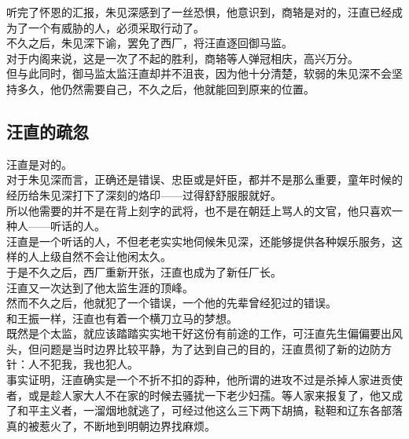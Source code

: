 \begin{multicols}{\theparacolNo}
听完了怀恩的汇报，朱见深感到了一丝恐惧，他意识到，商辂是对的，汪直已经成为了一个有威胁的人，必须采取行动了。\\

不久之后，朱见深下谕，罢免了西厂，将汪直逐回御马监。\\

对于内阁来说，这是一次了不起的胜利，商辂等人弹冠相庆，高兴万分。\\

但与此同时，御马监太监汪直却并不沮丧，因为他十分清楚，软弱的朱见深不会坚持多久，他仍然需要自己，不久之后，他就能回到原来的位置。\\

\subsection{汪直的疏忽}
汪直是对的。\\

对于朱见深而言，正确还是错误、忠臣或是奸臣，都并不是那么重要，童年时候的经历给朱见深打下了深刻的烙印——过得舒舒服服就好。\\

所以他需要的并不是在背上刻字的武将，也不是在朝廷上骂人的文官，他只喜欢一种人——听话的人。\\

汪直是一个听话的人，不但老老实实地伺候朱见深，还能够提供各种娱乐服务，这样的人上级自然不会让他闲太久。\\

于是不久之后，西厂重新开张，汪直也成为了新任厂长。\\

汪直又一次达到了他太监生涯的顶峰。\\

然而不久之后，他就犯了一个错误，一个他的先辈曾经犯过的错误。\\

和王振一样，汪直也有着一个横刀立马的梦想。\\

既然是个太监，就应该踏踏实实地干好这份有前途的工作，可汪直先生偏偏要出风头，但问题是当时边界比较平静，为了达到自己的目的，汪直贯彻了新的边防方针：人不犯我，我也犯人。\\

事实证明，汪直确实是一个不折不扣的孬种，他所谓的进攻不过是杀掉人家进贡使者，或是趁人家大人不在家的时候去骚扰一下老少妇孺。等人家来报复了，他又成了和平主义者，一溜烟地就逃了，可经过他这么三下两下胡搞，鞑靼和辽东各部落真的被惹火了，不断地到明朝边界找麻烦。\\


\end{multicols}
